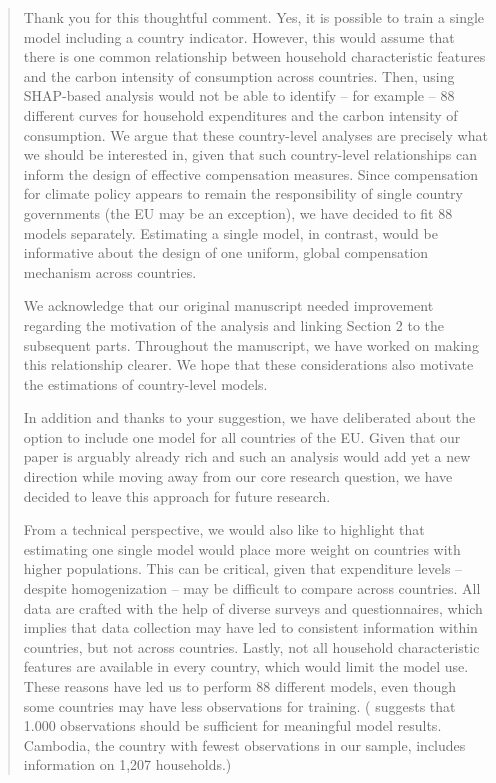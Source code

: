 \documentclass[11pt]{article}
\newenvironment{response}
{\begin{quote}\color{black}}
{\end{quote}}
\begin{document}
\begin{response}
    Thank you for this thoughtful comment. Yes, it is possible to train a single model including a country indicator. However, this would assume that there is one common relationship between household characteristic features and the carbon intensity of consumption across countries. Then, using SHAP-based analysis would not be able to identify -- for example -- 88 different curves for household expenditures and the carbon intensity of consumption. We argue that these country-level analyses are precisely what we should be interested in, given that such country-level relationships can inform the design of effective compensation measures. Since compensation for climate policy appears to remain the responsibility of single country governments (the EU may be an exception), we have decided to fit 88 models separately. Estimating a single model, in contrast, would be informative about the design of one uniform, global compensation mechanism across countries.

    We acknowledge that our original manuscript needed improvement regarding the motivation of the analysis and linking Section 2 to the subsequent parts. Throughout the manuscript, we have worked on making this relationship clearer. We hope that these considerations also motivate the estimations of country-level models. 

    In addition and thanks to your suggestion, we have deliberated about the option to include one model for all countries of the EU. Given that our paper is arguably already rich and such an analysis would add yet a new direction while moving away from our core research question, we have decided to leave this approach for future research.

    From a technical perspective, we would also like to highlight that estimating one single model would place more weight on countries with higher populations. This can be critical, given that expenditure levels -- despite homogenization -- may be difficult to compare across countries. All data are crafted with the help of diverse surveys and questionnaires, which implies that data collection may have led to consistent information within countries, but not across countries. Lastly, not all household characteristic features are available in every country, which would limit the model use. These reasons have led us to perform 88 different models, even though some countries may have less observations for training. (\textcite{Elith.2008} suggests that 1.000 observations should be sufficient for meaningful model results. Cambodia, the country with fewest observations in our sample, includes information on 1,207 households.)
\end{response}
\end{document}
